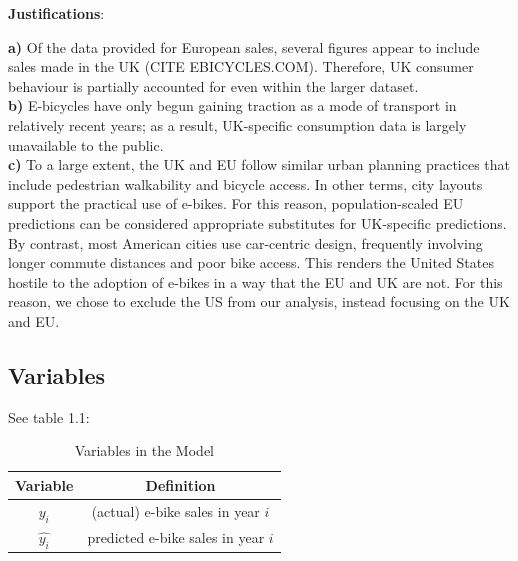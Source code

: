 \vspace{-6pt}
\noindent\textbf{Justifications}: \\
\vspace{-24pt}
\begin{adjustwidth}{24pt}{0pt}
    \noindent\textbf{a)} Of the data provided for European sales, several figures appear to include sales made in the UK (CITE EBICYCLES.COM). Therefore, UK consumer behaviour is partially accounted for even within the larger dataset. \\
    \noindent\textbf{b)} E-bicycles have only begun gaining traction as a mode of transport in relatively recent years; as a result, UK-specific consumption data is largely unavailable to the public. \\
    \noindent\textbf{c)} To a large extent, the UK and EU follow similar urban planning practices that include pedestrian walkability and bicycle access.
    In other terms, city layouts support the practical use of e-bikes.
    For this reason, population-scaled EU predictions can be considered appropriate substitutes for UK-specific predictions.
    By contrast, most American cities use car-centric design, frequently involving longer commute distances and poor bike access.
    This renders the United States hostile to the adoption of e-bikes in a way that the EU and UK are not.
    For this reason, we chose to exclude the US from our analysis, instead focusing on the UK and EU.
\end{adjustwidth}

%

\subsection{Variables}
See table 1.1:
\begin{table}[h!]
    \centering
    \begin{tabular}{cc}
        \toprule
        Variable & Definition      \\
        \midrule
        $y_i$      & (actual) e-bike sales in year $i$     \\
        $\hat{y_i}$      & predicted e-bike sales in year $i$     \\
        \bottomrule
    \end{tabular}
    \caption{Variables in the Model}
    \label{tab:q1_vars}
\end{table}

